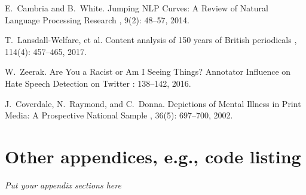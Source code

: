 \documentclass{report}
\begin{document}



\appendix

\begin{thebibliography}{HHM99}
  
E.~Cambria and B.~White.
\newblock Jumping NLP Curves: A Review of Natural Language Processing Research
, 9(2):  48--57, 2014.


T.~Lansdall-Welfare, et al.
\newblock Content analysis of 150 years of British periodicals
, 114(4):  457--465, 2017.

W.~Zeerak.
\newblock Are You a Racist or Am I Seeing Things? Annotator Influence on Hate Speech Detection on Twitter
:  138--142, 2016.

J.~Coverdale, N.~Raymond, and C.~Donna.
\newblock Depictions of Mental Illness in Print Media: A Prospective National Sample
, 36(5):  697--700, 2002.

\end{thebibliography}

\chapter{Other appendices, e.g., code listing}  %
\emph{Put your appendix sections here}

\end{document}
